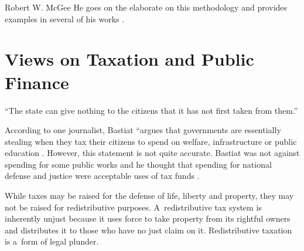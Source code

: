 \begin{artengenv}{Robert W. McGee}
He goes on the elaborate on this methodology and provides examples in several of his works 
\parencites[][]{bastiat_ce_1850}[][]{bastiat_harmonies_1870}[][]{bastiat_ce_1873}[][]{bastiat_sophismes_1873}[][]{bastiat_economic_1964}[][]{bastiat_economic_1964-1}[][]{bastiat_selected_1964}[][]{bastiat_bastiat_2007}.%




\section{Views on Taxation and Public Finance}

\begin{flushright}
``The state can give nothing to the citizens that it has not first taken from them.'' 
\parencite[][p.183]{bastiat_selected_1964}%
\end{flushright}




According to one journalist, Bastiat ``argues that governments are essentially stealing when they tax their citizens to spend on welfare, infrastructure or public education 
\parencite[][]{zernike_shaping_2010}. %
 However, this statement is not quite accurate. Bastiat was not against spending for some public works 
\parencite[][p.46]{bastiat_economic_1964} %
 and he thought that spending for national defense and justice were acceptable uses of tax funds 
\parencite[][p.184]{bastiat_selected_1964}.%




While taxes may be raised for the defense of life, liberty and property, they may not be raised for redistributive purposes. A~redistributive tax system is inherently unjust because it uses force to take property from its rightful owners and distributes it to those who have no just claim on it. Redistributive taxation is a~form of legal plunder.




\end{artengenv}
